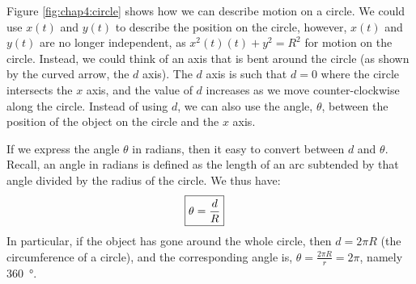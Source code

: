 Figure \ref{fig:chap4:circle} shows how we can describe motion on a circle. We could use $x(t)$ and $y(t)$ to describe the position on the circle, however, $x(t)$ and $y(t)$ are no longer independent, as $x^2(t)(t)+y^2=R^2$ for motion on the circle. Instead, we could think of an axis that is bent around the circle (as shown by the curved arrow, the $d$ axis). The $d$ axis is such that $d=0$ where the circle intersects the $x$ axis, and the value of $d$ increases as we move counter-clockwise along the circle. Instead of using $d$, we can also use the angle, $\theta$, between the position of the object on the circle and the $x$ axis. 

If we express the angle $\theta$ in radians, then it easy to convert between $d$ and $\theta$. Recall, an angle in radians is defined as the length of an arc subtended by that angle divided by the radius of the circle. We thus have:
\begin{align}
\label{eqn:chap4:raddef}
\Aboxed{\theta=\frac{d}{R}}
\end{align}
In particular, if the object has gone around the whole circle, then $d=2\pi R$ (the circumference of a circle), and the corresponding angle is, $\theta=\frac{2\pi R}{r}=2\pi$, namely \SI{360}{\degree}. 

